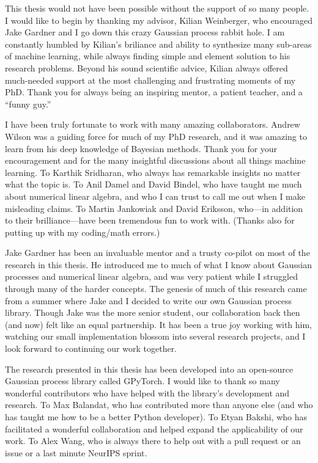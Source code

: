 This thesis would not have been possible without the support of so many people.
I would like to begin by thanking my advisor, Kilian Weinberger, who encouraged Jake Gardner and I go down this crazy Gaussian process rabbit hole.
I am constantly humbled by Kilian's briliance and ability to synthesize many sub-areas of machine learning, while always finding simple and element solution to his research problems.
Beyond his sound scientific advice, Kilian always offered much-needed support at the most challenging and frustrating moments of my PhD.
Thank you for always being an inspiring mentor, a patient teacher, and a ``funny guy.''

I have been truly fortunate to work with many amazing collaborators.
Andrew Wilson was a guiding force for much of my PhD research, and it was amazing to learn from his deep knowledge of Bayesian methods.
Thank you for your encouragement and for the many insightful discussions about all things machine learning.
To Karthik Sridharan, who always has remarkable insights no matter what the topic is.
To Anil Damel and David Bindel, who have taught me much about numerical linear algebra, and who I can trust to call me out when I make misleading claims.
To Martin Jankowiak and David Eriksson, who---in addition to their brilliance---have been tremendous fun to work with.
(Thanks also for putting up with my coding/math errors.)

Jake Gardner has been an invaluable mentor and a trusty co-pilot on most of the research in this thesis.
He introduced me to much of what I know about Gaussian processes and numerical linear algebra, and was very patient while I struggled through many of the harder concepts.
The genesis of much of this research came from a summer where Jake and I decided to write our own Gaussian process library.
Though Jake was the more senior student, our collaboration back then (and now) felt like an equal partnership.
It has been a true joy working with him, watching our small implementation blossom into several research projects, and I look forward to continuing our work together.

The research presented in this thesis has been developed into an open-source Gaussian process library called GPyTorch.
I would like to thank so many wonderful contributors who have helped with the library's development and research.
To Max Balandat, who has contributed more than anyone else (and who has taught me how to be a better Python developer).
To Etyan Bakshi, who has facilitated a wonderful collaboration and helped expand the applicability of our work.
To Alex Wang, who is always there to help out with a pull request or an issue or a last minute NeurIPS sprint.

